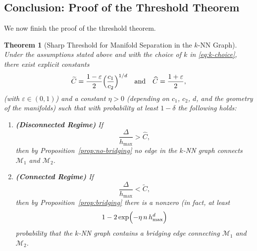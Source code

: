 \documentclass{article}
\theoremstyle{plain}
\newtheorem{theorem}{Theorem}[section]
\theoremstyle{definition}
\theoremstyle{remark}
\begin{document}
\subsection{Conclusion: Proof of the Threshold Theorem}

We now finish the proof of the threshold theorem.

\begin{theorem}[Sharp Threshold for Manifold Separation in the \(k\)-NN Graph]\label{thm:knn-threshold-final}
Under the assumptions stated above and with the choice of \(k\) in \eqref{eq:k-choice}, there exist explicit constants
\[
\widetilde{C} = \frac{1-\varepsilon}{2}\Bigl(\frac{c_1}{c_2}\Bigr)^{1/d} \quad \text{and} \quad \widehat{C} = \frac{1+\varepsilon}{2},
\]
(with \(\varepsilon\in (0,1)\)) and a constant \(\eta>0\) (depending on \(c_1\), \(c_2\), \(d\), and the geometry of the manifolds) such that with probability at least \(1-\delta\) the following holds:
\begin{enumerate}
    \item \textbf{(Disconnected Regime)} If 
    \[
    \frac{\Delta}{h_{\max}} > \widehat{C},
    \]
    then by Proposition~\ref{prop:no-bridging} no edge in the \(k\)-NN graph connects \(\mathcal{M}_1\) and \(\mathcal{M}_2\).
    \medskip
    \item \textbf{(Connected Regime)} If 
    \[
    \frac{\Delta}{h_{\max}} < \widetilde{C},
    \]
    then by Proposition~\ref{prop:bridging} there is a nonzero (in fact, at least 
    \[
    1-2\exp\Bigl(-\eta\,n\,h_{\max}^d\Bigr)
    \]
    probability that the \(k\)-NN graph contains a bridging edge connecting \(\mathcal{M}_1\) and \(\mathcal{M}_2\).
\end{enumerate}
\end{theorem}
\end{document}
